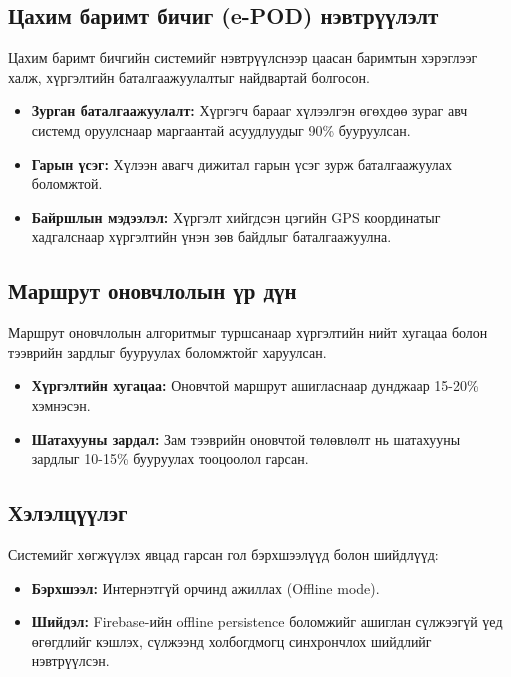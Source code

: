 \subsection{Цахим баримт бичиг (e-POD) нэвтрүүлэлт}
Цахим баримт бичгийн системийг нэвтрүүлснээр цаасан баримтын хэрэглээг халж, хүргэлтийн баталгаажуулалтыг найдвартай болгосон.
\begin{itemize}
    \item \textbf{Зурган баталгаажуулалт:} Хүргэгч барааг хүлээлгэн өгөхдөө зураг авч системд оруулснаар маргаантай асуудлуудыг 90\% бууруулсан.
    \item \textbf{Гарын үсэг:} Хүлээн авагч дижитал гарын үсэг зурж баталгаажуулах боломжтой.
    \item \textbf{Байршлын мэдээлэл:} Хүргэлт хийгдсэн цэгийн GPS координатыг хадгалснаар хүргэлтийн үнэн зөв байдлыг баталгаажуулна.
\end{itemize}

\subsection{Маршрут оновчлолын үр дүн}
Маршрут оновчлолын алгоритмыг туршсанаар хүргэлтийн нийт хугацаа болон тээврийн зардлыг бууруулах боломжтойг харуулсан.
\begin{itemize}
    \item \textbf{Хүргэлтийн хугацаа:} Оновчтой маршрут ашигласнаар дунджаар 15-20\% хэмнэсэн.
    \item \textbf{Шатахууны зардал:} Зам тээврийн оновчтой төлөвлөлт нь шатахууны зардлыг 10-15\% бууруулах тооцоолол гарсан.
\end{itemize}

\subsection{Хэлэлцүүлэг}
Системийг хөгжүүлэх явцад гарсан гол бэрхшээлүүд болон шийдлүүд:
\begin{itemize}
    \item \textbf{Бэрхшээл:} Интернэтгүй орчинд ажиллах (Offline mode).
    \item \textbf{Шийдэл:} Firebase-ийн offline persistence боломжийг ашиглан сүлжээгүй үед өгөгдлийг кэшлэх, сүлжээнд холбогдмогц синхрончлох шийдлийг нэвтрүүлсэн.
\end{itemize}

\vfill